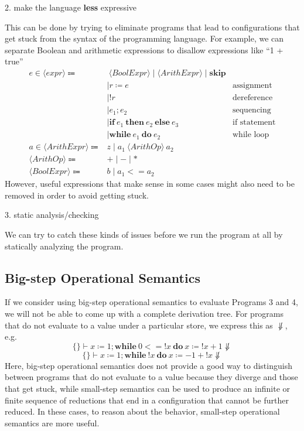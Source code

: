 2. make the language \textbf{less} expressive

This can be done by trying to eliminate programs that lead to configurations that get stuck from the syntax of the programming language. For example, we can separate Boolean and arithmetic expressions to disallow expressions like ``1 + true''
\[
\begin{aligned}
  e \in \langle expr \rangle \Coloneqq &\ \langle BoolExpr \rangle \mid \langle ArithExpr \rangle \mid \mathbf{skip} \\
  &\mid r \coloneqq e & \text{assignment} \\
  &\mid !r & \text{dereference} \\
  &\mid e_1; e_2 & \text{sequencing} \\
  &\mid \mathbf{if}\ e_1\ \mathbf{then}\ e_2\ \mathbf{else}\ e_3 & \text{if statement} \\
  &\mid \mathbf{while}\ e_1\ \mathbf{do}\ e_2 & \text{while loop} \\
  a \in \langle ArithExpr \rangle \Coloneqq & z \mid a_1\ \langle ArithOp \rangle\ a_2 \\
  \langle ArithOp \rangle \Coloneqq & + \mid - \mid * \\
  \langle BoolExpr \rangle \Coloneqq & b \mid a_1 <= a_2
\end{aligned}
\]
However, useful expressions that make sense in some cases might also need to be removed in order to avoid getting stuck. 

3. static analysis/checking

We can try to catch these kinds of issues before we run the program at all by statically analyzing the program.

\subsection{Big-step Operational Semantics}
If we consider using big-step operational semantics to evaluate Programs 3 and 4, we will not be able to come up with a complete derivation tree. For programs that do not evaluate to a value under a particular store, we express this as \(\not\Downarrow\), e.g. 
\[
  \{\} \vdash x \coloneqq 1; \mathbf{while}\ 0 <= !x\ \mathbf{do}\ x \coloneqq !x + 1 \not\Downarrow
\]
\[
  \{\} \vdash x \coloneqq 1; \mathbf{while}\ !x\ \mathbf{do}\ x \coloneqq -1 + !x \not\Downarrow
\]
Here, big-step operational semantics does not provide a good way to distinguish between programs that do not evaluate to a value because they diverge and those that get stuck, while small-step semantics can be used to produce an infinite or finite sequence of reductions that end in a configuration that cannot be further reduced. In these cases, to reason about the behavior, small-step operational semantics are more useful.
